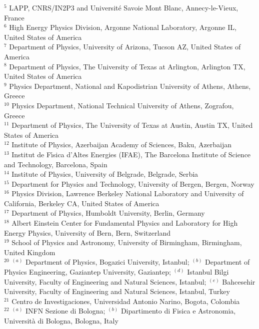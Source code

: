 \begin{flushleft}
$^{5}$ LAPP, CNRS/IN2P3 and Universit{\'e} Savoie Mont Blanc, Annecy-le-Vieux, France\\
$^{6}$ High Energy Physics Division, Argonne National Laboratory, Argonne IL, United States of America\\
$^{7}$ Department of Physics, University of Arizona, Tucson AZ, United States of America\\
$^{8}$ Department of Physics, The University of Texas at Arlington, Arlington TX, United States of America\\
$^{9}$ Physics Department, National and Kapodistrian University of Athens, Athens, Greece\\
$^{10}$ Physics Department, National Technical University of Athens, Zografou, Greece\\
$^{11}$ Department of Physics, The University of Texas at Austin, Austin TX, United States of America\\
$^{12}$ Institute of Physics, Azerbaijan Academy of Sciences, Baku, Azerbaijan\\
$^{13}$ Institut de F{\'\i}sica d'Altes Energies (IFAE), The Barcelona Institute of Science and Technology, Barcelona, Spain\\
$^{14}$ Institute of Physics, University of Belgrade, Belgrade, Serbia\\
$^{15}$ Department for Physics and Technology, University of Bergen, Bergen, Norway\\
$^{16}$ Physics Division, Lawrence Berkeley National Laboratory and University of California, Berkeley CA, United States of America\\
$^{17}$ Department of Physics, Humboldt University, Berlin, Germany\\
$^{18}$ Albert Einstein Center for Fundamental Physics and Laboratory for High Energy Physics, University of Bern, Bern, Switzerland\\
$^{19}$ School of Physics and Astronomy, University of Birmingham, Birmingham, United Kingdom\\
$^{20}$ $^{(a)}$ Department of Physics, Bogazici University, Istanbul; $^{(b)}$ Department of Physics Engineering, Gaziantep University, Gaziantep; $^{(d)}$ Istanbul Bilgi University, Faculty of Engineering and Natural Sciences, Istanbul; $^{(e)}$ Bahcesehir University, Faculty of Engineering and Natural Sciences, Istanbul, Turkey\\
$^{21}$ Centro de Investigaciones, Universidad Antonio Narino, Bogota, Colombia\\
$^{22}$ $^{(a)}$ INFN Sezione di Bologna; $^{(b)}$ Dipartimento di Fisica e Astronomia, Universit{\`a} di Bologna, Bologna, Italy\\

\end{flushleft}
